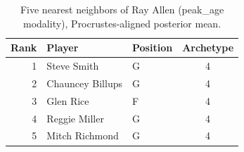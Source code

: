 \begin{table}[htbp]
  \centering\small
  \begin{tabular}{rllc}
    \toprule
    Rank & Player & Position & Archetype \\
    \midrule
    1 & Steve Smith & G & 4 \\
    2 & Chauncey Billups & G & 4 \\
    3 & Glen Rice & F & 4 \\
    4 & Reggie Miller & G & 4 \\
    5 & Mitch Richmond & G & 4 \\
    \bottomrule
  \end{tabular}
  \caption{Five nearest neighbors of Ray Allen (peak_age modality), Procrustes-aligned posterior mean.}
  \label{tab:Ray_Allen_neighbors_peak_age}
\end{table}

